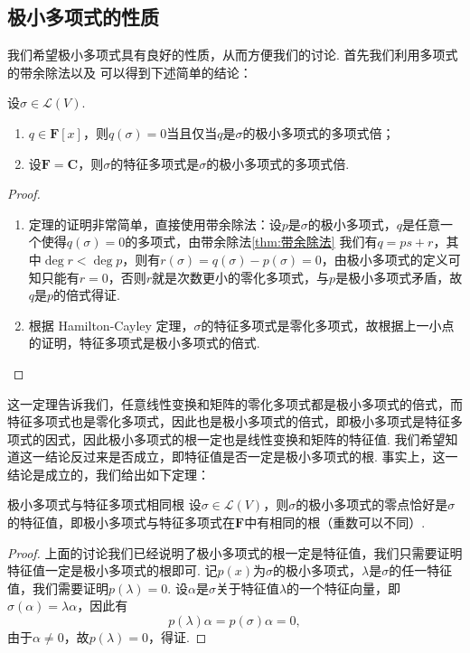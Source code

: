 \subsection{极小多项式的性质}

我们希望极小多项式具有良好的性质，从而方便我们的讨论. 首先我们利用多项式的带余除法以及 可以得到下述简单的结论：
\begin{theorem}{}{}
    设$\sigma\in \mathcal{L}(V)$.
    \begin{enumerate}
        \item $q\in\mathbf{F}[x]$，则$q(\sigma)=0$当且仅当$q$是$\sigma$的极小多项式的多项式倍；

        \item 设$\mathbf{F}=\mathbf{C}$，则$\sigma$的特征多项式是$\sigma$的极小多项式的多项式倍.
    \end{enumerate}
\end{theorem}

\begin{proof}
    \begin{enumerate}
        \item 定理的证明非常简单，直接使用带余除法：设$p$是$\sigma$的极小多项式，$q$是任意一个使得$q(\sigma)=0$的多项式，由带余除法\autoref{thm:带余除法} 我们有$q=ps+r$，其中$\deg r<\deg p$，则有$r(\sigma)=q(\sigma)-p(\sigma)=0$，由极小多项式的定义可知只能有$r=0$，否则$r$就是次数更小的零化多项式，与$p$是极小多项式矛盾，故$q$是$p$的倍式得证.

        \item 根据 Hamilton-Cayley 定理，$\sigma$的特征多项式是零化多项式，故根据上一小点的证明，特征多项式是极小多项式的倍式.
    \end{enumerate}
\end{proof}

这一定理告诉我们，任意线性变换和矩阵的零化多项式都是极小多项式的倍式，而特征多项式也是零化多项式，因此也是极小多项式的倍式，即极小多项式是特征多项式的因式，因此极小多项式的根一定也是线性变换和矩阵的特征值. 我们希望知道这一结论反过来是否成立，即特征值是否一定是极小多项式的根. 事实上，这一结论是成立的，我们给出如下定理：
\begin{theorem}{}{极小多项式与特征多项式相同根}
    设$\sigma\in \mathcal{L}(V)$，则$\sigma$的极小多项式的零点恰好是$\sigma$的特征值，即极小多项式与特征多项式在$\mathbf{F}$中有相同的根（重数可以不同）.
\end{theorem}

\begin{proof}
    上面的讨论我们已经说明了极小多项式的根一定是特征值，我们只需要证明特征值一定是极小多项式的根即可. 记$p(x)$为$\sigma$的极小多项式，$\lambda$是$\sigma$的任一特征值，我们需要证明$p(\lambda)=0$. 设$\alpha$是$\sigma$关于特征值$\lambda$的一个特征向量，即$\sigma(\alpha)=\lambda\alpha$，因此有
    \[p(\lambda)\alpha=p(\sigma)\alpha=0,\]
    由于$\alpha\neq 0$，故$p(\lambda)=0$，得证.
\end{proof}

